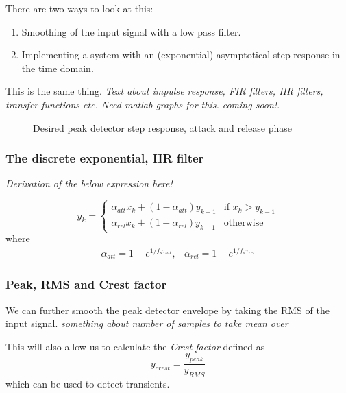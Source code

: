 \documentclass[]{article}
\begin{document}
There are two ways to look at this:
\begin{enumerate}
\item Smoothing of the input signal with a low pass filter.
\item Implementing a system with an (exponential) asymptotical step response in the time domain.
\end{enumerate}

This is the same thing. \emph{Text about impulse response, FIR filters, IIR filters, transfer functions etc. Need matlab-graphs for this. coming soon!}.

\begin{figure}[ht]
\centering

\caption{Desired peak detector step response, attack and release phase} 
\label{fig:attack-release-graph}
\end{figure}

\subsubsection{The discrete exponential, IIR filter}
\emph{Derivation of the below expression here!}

\begin{equation}
y_k = \left\{
  \begin{array}{ll}
    \alpha_{att} x_k + (1-\alpha_{att})y_{k-1} & \text{if }  x_k > y_{k-1} \\
    \alpha_{rel} x_k + (1-\alpha_{rel})y_{k-1} & \text{otherwise} 
  \end{array}
\right.
\end{equation}
where
\begin{equation}
\begin{array}{lr}
\alpha_{att} = 1-e^{1/f_s \tau_{att}}, & \alpha_{rel} = 1-e^{1/f_s \tau_{rel}}
\end{array}
\end{equation}

\subsubsection{Peak, RMS and Crest factor}
We can further smooth the peak detector envelope by taking the RMS of the input signal. \emph{something about number of samples to take mean over}

This will also allow us to calculate the \emph{Crest factor} defined as
\begin{equation}
y_{crest} = \frac{y_{peak}}{y_{RMS}}
\end{equation}
which can be used to detect transients.
\end{document}
